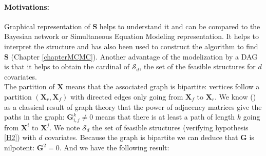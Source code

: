 \documentclass[12pt,a4paper]{report}
\begin{document}
\paragraph{Motivations:} Graphical representation of $\boldsymbol{S}$ helps to understand it and can be compared to the Bayesian network or Simultaneous Equation Modeling representation. It helps to interpret the structure and has also been used to construct the algorithm to find $\boldsymbol{S}$ (Chapter \ref{chapterMCMC}). Another advantage of the modelization by a DAG is that it helps to obtain the cardinal of $\mathcal{S}_d$, the set of the feasible structures for $d$ covariates.\\
	
	The partition of $\boldsymbol{X}$ means that the associated graph is bipartite: vertices follow a partition $(\boldsymbol{X}_r,\boldsymbol{X}_f)$ with directed edges only going from $\boldsymbol{X}_f$ to $\boldsymbol{X}_r$.
	We know (\cite{biggs1993algebraic}) as a classical result of graph theory that the power of adjacency matrices give the paths in the graph: $\boldsymbol{G}^k_{i,j}\neq 0$ means that there is at least a path of length $k$ going from $\boldsymbol{X}^i$ to $\boldsymbol{X}^j$. We note $\mathcal{S}_d$ the set of feasible structures (verifying hypothesis \ref{H2}) with $d$ covariates. Because the graph is bipartite we can deduce that $\boldsymbol{G}$ is nilpotent: $\boldsymbol{G}^2=0$. And we have the following result:\\
	\\
\end{document}
